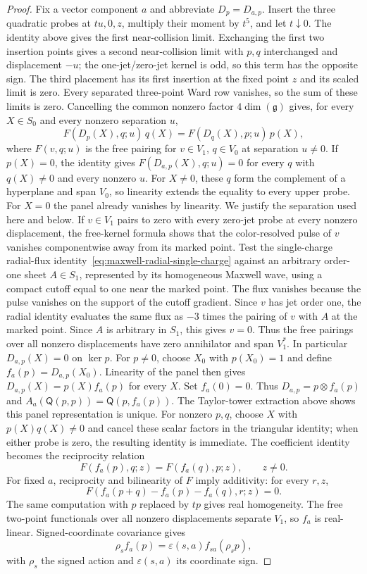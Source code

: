 \begin{proof}
Fix a vector component $a$ and abbreviate $D_p=D_{a,p}$.  Insert the
three quadratic probes at $tu,0,z$, multiply their moment by
$t^5$, and let $t\downarrow0$.  The identity above gives the first
near-collision limit.  Exchanging the first two insertion points gives a
second near-collision limit with $p,q$ interchanged and displacement
$-u$; the one-jet/zero-jet kernel is odd, so this term has the opposite
sign.  The third placement has its first insertion at the fixed point $z$
and its scaled limit is zero.  Every separated three-point Ward row
vanishes, so the sum of these limits is zero.  Cancelling the common
nonzero factor $4\dim(\mathfrak g)$ gives, for every $X\in S_0$ and every
nonzero separation $u$,
\[
 F(D_p(X),q;u)\,q(X)=F(D_q(X),p;u)\,p(X),
\]
where $F(v,q;u)$ is the free pairing for $v\in V_1$, $q\in V_0$ at
separation $u\ne0$.  If $p(X)=0$, the identity gives
$F(D_{a,p}(X),q;u)=0$ for every $q$ with $q(X)\ne0$ and every nonzero
$u$.  For $X\ne0$, these $q$ form the complement of a hyperplane and
span $V_0$, so linearity extends the equality to every upper probe.  For
$X=0$ the panel already vanishes by linearity.  We justify the separation
used here and below.  If $v\in V_1$ pairs to zero with every zero-jet
probe at every nonzero displacement, the free-kernel formula shows that
the color-resolved pulse of $v$ vanishes componentwise away from its
marked point.  Test the single-charge radial-flux
identity~\eqref{eq:maxwell-radial-single-charge} against an arbitrary
order-one sheet $A\in S_1$, represented by its homogeneous Maxwell wave,
using a compact cutoff equal to one near the marked point.
The flux vanishes because the pulse vanishes on
the support of the cutoff gradient.  Since $v$ has jet order one, the
radial identity evaluates the same flux as $-3$ times the pairing of $v$
with $A$ at the marked point.  Since $A$ is arbitrary in $S_1$, this gives
$v=0$.  Thus the
free pairings over all nonzero displacements have zero annihilator and span
$V_1^*$.  In particular $D_{a,p}(X)=0$ on $\ker p$.  For $p\ne0$, choose
$X_0$ with $p(X_0)=1$ and define $f_a(p)=D_{a,p}(X_0)$.  Linearity of the
panel then gives $D_{a,p}(X)=p(X)f_a(p)$ for every $X$.  Set $f_a(0)=0$.
Thus $D_{a,p}=p\otimes f_a(p)$ and
$A_a(\mathsf Q(p,p))=\mathsf Q(p,f_a(p))$.  The Taylor-tower
extraction above shows this panel representation is unique.  For nonzero
$p,q$, choose $X$ with $p(X)q(X)\ne0$ and cancel these scalar factors in
the triangular identity; when either probe is zero, the resulting
identity is immediate.  The coefficient
identity becomes the reciprocity relation
\[
 F(f_a(p),q;z)=F(f_a(q),p;z),\qquad z\ne0.
\]
For fixed $a$, reciprocity and bilinearity of $F$ imply additivity:
for every $r,z$,
\[
 F(f_a(p+q)-f_a(p)-f_a(q),r;z)=0.
\]
The same computation with $p$ replaced by $tp$ gives real homogeneity.
The free two-point functionals over all nonzero displacements separate
$V_1$, so $f_a$ is real-linear.
Signed-coordinate covariance gives
\[
 \rho_s f_a(p)=\varepsilon(s,a)f_{s a}(\rho_s p),
\]
with $\rho_s$ the signed action and $\varepsilon(s,a)$ its coordinate sign.


\end{proof}
